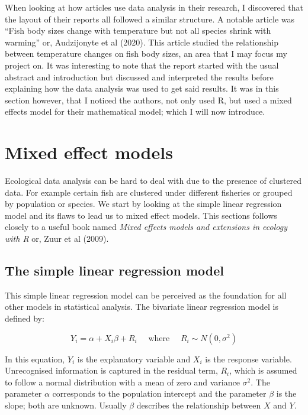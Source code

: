 \documentclass{article}
\begin{document}
When looking at how articles use data analysis in their research, I discovered that the layout of their reports all followed a similar structure. A notable article was “Fish body sizes change with temperature but not all species shrink with warming” \cite{7} or, Audzijonyte et al (2020). This article studied the relationship between temperature changes on fish body sizes, an area that I may focus my project on. It was interesting to note that the report started with the usual abstract and introduction but discussed and interpreted the results before explaining how the data analysis was used to get said results. It was in this section however, that I noticed the authors, not only used R, but used a mixed effects model for their mathematical model; which I will now introduce.

\section{Mixed effect models}

Ecological data analysis can be hard to deal with due to the presence of clustered data. For example certain fish are clustered under different fisheries or grouped by population or species. We start by looking at the simple linear regression model and its flaws to lead us to mixed effect models. This sections follows closely to a useful book named \textit{Mixed effects models and extensions in ecology with R} \cite{13} or, Zuur et al (2009).

\subsection{The simple linear regression model}

This simple linear regression model can be perceived as the foundation for all other models in statistical analysis. The bivariate linear regression model is defined by:

\[
Y_i = \alpha + X_i \beta + R_i 
\quad \mbox{ where } \quad
R_i \sim N(0, \sigma^2)
\]

In this equation, $Y_i$ is the explanatory variable and $X_i$ is the response variable. Unrecognised information is captured in the residual term, $R_i$, which is assumed to follow a normal distribution with a mean of zero and variance $\sigma^2$. The parameter $\alpha$ corresponds to the population intercept and the parameter $\beta$ is the slope; both are unknown. Usually $\beta$ describes the relationship between $X$ and $Y$.
\end{document}
